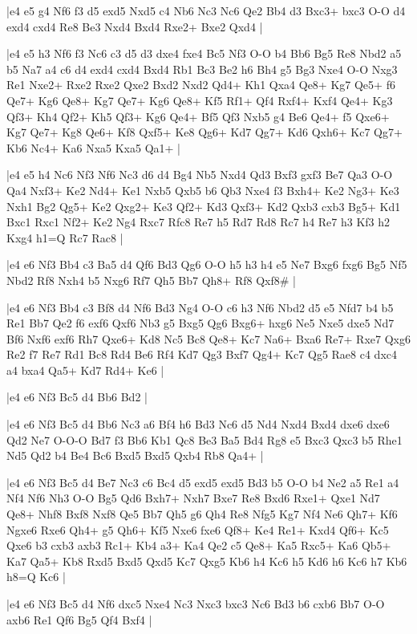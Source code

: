 \whitename{}
\blackname{}
\makegametitle
|e4 e5 g4 Nf6 f3 d5 exd5 Nxd5 c4 Nb6 Nc3 Nc6 Qe2 Bb4 d3 Bxc3+ bxc3 O-O d4 exd4 cxd4 Re8 Be3 Nxd4 Bxd4 Rxe2+ Bxe2 Qxd4  |

\whitename{}
\blackname{}
\makegametitle
|e4 e5 h3 Nf6 f3 Nc6 c3 d5 d3 dxe4 fxe4 Bc5 Nf3 O-O b4 Bb6 Bg5 Re8 Nbd2 a5 b5 Na7 a4 c6 d4 exd4 cxd4 Bxd4 Rb1 Bc3 Be2 h6 Bh4 g5 Bg3 Nxe4 O-O Nxg3 Re1 Nxe2+ Rxe2 Rxe2 Qxe2 Bxd2 Nxd2 Qd4+ Kh1 Qxa4 Qe8+ Kg7 Qe5+ f6 Qe7+ Kg6 Qe8+ Kg7 Qe7+ Kg6 Qe8+ Kf5 Rf1+ Qf4 Rxf4+ Kxf4 Qe4+ Kg3 Qf3+ Kh4 Qf2+ Kh5 Qf3+ Kg6 Qe4+ Bf5 Qf3 Nxb5 g4 Be6 Qe4+ f5 Qxe6+ Kg7 Qe7+ Kg8 Qe6+ Kf8 Qxf5+ Ke8 Qg6+ Kd7 Qg7+ Kd6 Qxh6+ Kc7 Qg7+ Kb6 Nc4+ Ka6 Nxa5 Kxa5 Qa1+  |

\whitename{}
\blackname{}
\makegametitle
|e4 e5 h4 Nc6 Nf3 Nf6 Nc3 d6 d4 Bg4 Nb5 Nxd4 Qd3 Bxf3 gxf3 Be7 Qa3 O-O Qa4 Nxf3+ Ke2 Nd4+ Ke1 Nxb5 Qxb5 b6 Qb3 Nxe4 f3 Bxh4+ Ke2 Ng3+ Ke3 Nxh1 Bg2 Qg5+ Ke2 Qxg2+ Ke3 Qf2+ Kd3 Qxf3+ Kd2 Qxb3 cxb3 Bg5+ Kd1 Bxc1 Rxc1 Nf2+ Ke2 Ng4 Rxc7 Rfc8 Re7 h5 Rd7 Rd8 Rc7 h4 Re7 h3 Kf3 h2 Kxg4 h1=Q Rc7 Rac8  |

\whitename{}
\blackname{}
\makegametitle
|e4 e6 Nf3 Bb4 c3 Ba5 d4 Qf6 Bd3 Qg6 O-O h5 h3 h4 e5 Ne7 Bxg6 fxg6 Bg5 Nf5 Nbd2 Rf8 Nxh4 b5 Nxg6 Rf7 Qh5 Bb7 Qh8+ Rf8 Qxf8\#  |

\whitename{}
\blackname{}
\makegametitle
|e4 e6 Nf3 Bb4 c3 Bf8 d4 Nf6 Bd3 Ng4 O-O c6 h3 Nf6 Nbd2 d5 e5 Nfd7 b4 b5 Re1 Bb7 Qe2 f6 exf6 Qxf6 Nb3 g5 Bxg5 Qg6 Bxg6+ hxg6 Ne5 Nxe5 dxe5 Nd7 Bf6 Nxf6 exf6 Rh7 Qxe6+ Kd8 Nc5 Bc8 Qe8+ Kc7 Na6+ Bxa6 Re7+ Rxe7 Qxg6 Re2 f7 Re7 Rd1 Bc8 Rd4 Be6 Rf4 Kd7 Qg3 Bxf7 Qg4+ Kc7 Qg5 Rae8 c4 dxc4 a4 bxa4 Qa5+ Kd7 Rd4+ Ke6  |

\whitename{}
\blackname{}
\makegametitle
|e4 e6 Nf3 Bc5 d4 Bb6 Bd2  |

\whitename{}
\blackname{}
\makegametitle
|e4 e6 Nf3 Bc5 d4 Bb6 Nc3 a6 Bf4 h6 Bd3 Nc6 d5 Nd4 Nxd4 Bxd4 dxe6 dxe6 Qd2 Ne7 O-O-O Bd7 f3 Bb6 Kb1 Qc8 Be3 Ba5 Bd4 Rg8 e5 Bxc3 Qxc3 b5 Rhe1 Nd5 Qd2 b4 Be4 Bc6 Bxd5 Bxd5 Qxb4 Rb8 Qa4+  |

\whitename{}
\blackname{}
\makegametitle
|e4 e6 Nf3 Bc5 d4 Be7 Nc3 c6 Bc4 d5 exd5 exd5 Bd3 b5 O-O b4 Ne2 a5 Re1 a4 Nf4 Nf6 Nh3 O-O Bg5 Qd6 Bxh7+ Nxh7 Bxe7 Re8 Bxd6 Rxe1+ Qxe1 Nd7 Qe8+ Nhf8 Bxf8 Nxf8 Qe5 Bb7 Qh5 g6 Qh4 Re8 Nfg5 Kg7 Nf4 Ne6 Qh7+ Kf6 Ngxe6 Rxe6 Qh4+ g5 Qh6+ Kf5 Nxe6 fxe6 Qf8+ Ke4 Re1+ Kxd4 Qf6+ Kc5 Qxe6 b3 cxb3 axb3 Rc1+ Kb4 a3+ Ka4 Qe2 c5 Qe8+ Ka5 Rxc5+ Ka6 Qb5+ Ka7 Qa5+ Kb8 Rxd5 Bxd5 Qxd5 Kc7 Qxg5 Kb6 h4 Kc6 h5 Kd6 h6 Kc6 h7 Kb6 h8=Q Kc6  |

\whitename{}
\blackname{}
\makegametitle
|e4 e6 Nf3 Bc5 d4 Nf6 dxc5 Nxe4 Nc3 Nxc3 bxc3 Nc6 Bd3 b6 cxb6 Bb7 O-O axb6 Re1 Qf6 Bg5 Qf4 Bxf4  |

